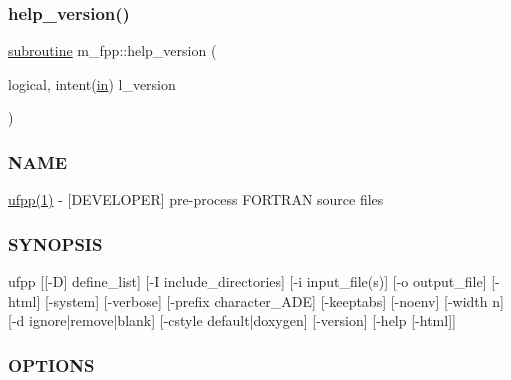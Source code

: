 \subsubsection{\texorpdfstring{help\+\_\+version()}{help\_version()}}
{\footnotesize\ttfamily \hyperlink{M__stopwatch_83_8txt_acfbcff50169d691ff02d4a123ed70482}{subroutine} m\+\_\+fpp\+::help\+\_\+version (\begin{DoxyParamCaption}\item[{logical, intent(\hyperlink{M__journal_83_8txt_afce72651d1eed785a2132bee863b2f38}{in})}]{l\+\_\+version }\end{DoxyParamCaption})}



\subsubsection*{N\+A\+ME}

\hyperlink{ufpp__overview_81_8txt_a97c20a96bcab81bc74c9d64b001f1202}{ufpp(1)} -\/ \mbox{[}D\+E\+V\+E\+L\+O\+P\+ER\mbox{]} pre-\/process F\+O\+R\+T\+R\+AN source files 

\subsubsection*{S\+Y\+N\+O\+P\+S\+IS}

\begin{DoxyVerb}ufpp  [[-D] define_list]
      [-I include_directories]
      [-i input_file(s)]
      [-o output_file]
      [-html]
      [-system]
      [-verbose]
      [-prefix character_ADE]
      [-keeptabs]
      [-noenv]
      [-width n]
      [-d ignore|remove|blank]
      [-cstyle default|doxygen]
      [-version]
      [-help [-html]]
\end{DoxyVerb}
 \subsubsection*{O\+P\+T\+I\+O\+NS}

